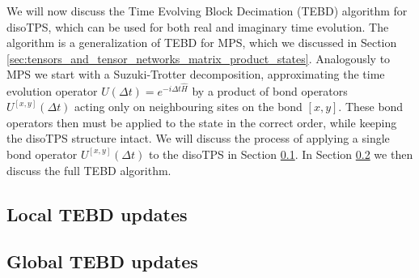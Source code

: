 We will now discuss the Time Evolving Block Decimation (TEBD) algorithm for disoTPS, which can be used for both real and imaginary time evolution. The algorithm is a generalization of TEBD for MPS, which we discussed in Section \ref{sec:tensors_and_tensor_networks_matrix_product_states}. Analogously to MPS we start with a Suzuki-Trotter decomposition, approximating the time evolution operator $U\left(\Delta t\right) = e^{-i\Delta t \hat{H}}$ by a product of bond operators $U^{[x, y]}\left(\Delta t\right)$ acting only on neighbouring sites on the bond $[x, y]$. These bond operators then must be applied to the state in the correct order, while keeping the disoTPS structure intact. We will discuss the process of applying a single bond operator $U^{[x,y]}\left(\Delta t\right)$ to the disoTPS in Section \ref{sec:YB_isoTPS_TEBD_local_updates}. In Section \ref{sec:YB_isoTPS_TEBD_global_updates} we then discuss the full TEBD algorithm.

\subsection{Local TEBD updates}
\label{sec:YB_isoTPS_TEBD_local_updates}


\subsection{Global TEBD updates}
\label{sec:YB_isoTPS_TEBD_global_updates}

